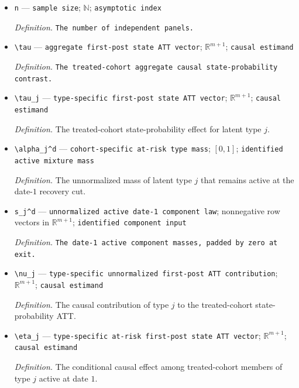 \documentclass{article}
\begin{document}
\begin{itemize}
  \item \texttt{n} --- \texttt{sample size}; \(\mathbb N\); \texttt{asymptotic index}
  \par\smallskip\noindent\emph{Definition.} \texttt{The number of independent panels.}
  \item \texttt{\textbackslash{}\allowbreak{}tau} --- \texttt{aggregate first-\allowbreak{}post state ATT vector}; \(\mathbb R^{m+1}\); \texttt{causal estimand}
  \par\smallskip\noindent\emph{Definition.} \texttt{The treated-\allowbreak{}cohort aggregate causal state-\allowbreak{}probability contrast.}
  \item \texttt{\textbackslash{}\allowbreak{}tau\_\allowbreak{}j} --- \texttt{type-\allowbreak{}specific first-\allowbreak{}post state ATT vector}; \(\mathbb R^{m+1}\); \texttt{causal estimand}
  \par\smallskip\noindent\emph{Definition.} The treated-cohort state-probability effect for latent type \(j\).
  \item \texttt{\textbackslash{}\allowbreak{}alpha\_\allowbreak{}j\textasciicircum{}d} --- \texttt{cohort-\allowbreak{}specific at-\allowbreak{}risk type mass}; \([0,1]\); \texttt{identified active mixture mass}
  \par\smallskip\noindent\emph{Definition.} The unnormalized mass of latent type \(j\) that remains active at the date-\(1\) recovery cut.
  \item \texttt{s\_\allowbreak{}j\textasciicircum{}d} --- \texttt{unnormalized active date-\allowbreak{}1 component law}; nonnegative row vectors in \(\mathbb R^{m+1}\); \texttt{identified component input}
  \par\smallskip\noindent\emph{Definition.} \texttt{The date-\allowbreak{}1 active component masses,\allowbreak{} padded by zero at exit.}
  \item \texttt{\textbackslash{}\allowbreak{}nu\_\allowbreak{}j} --- \texttt{type-\allowbreak{}specific unnormalized first-\allowbreak{}post ATT contribution}; \(\mathbb R^{m+1}\); \texttt{causal estimand}
  \par\smallskip\noindent\emph{Definition.} The causal contribution of type \(j\) to the treated-cohort state-probability ATT.
  \item \texttt{\textbackslash{}\allowbreak{}eta\_\allowbreak{}j} --- \texttt{type-\allowbreak{}specific at-\allowbreak{}risk first-\allowbreak{}post state ATT vector}; \(\mathbb R^{m+1}\); \texttt{causal estimand}
  \par\smallskip\noindent\emph{Definition.} The conditional causal effect among treated-cohort members of type \(j\) active at date \(1\).

\end{itemize}
\end{document}
